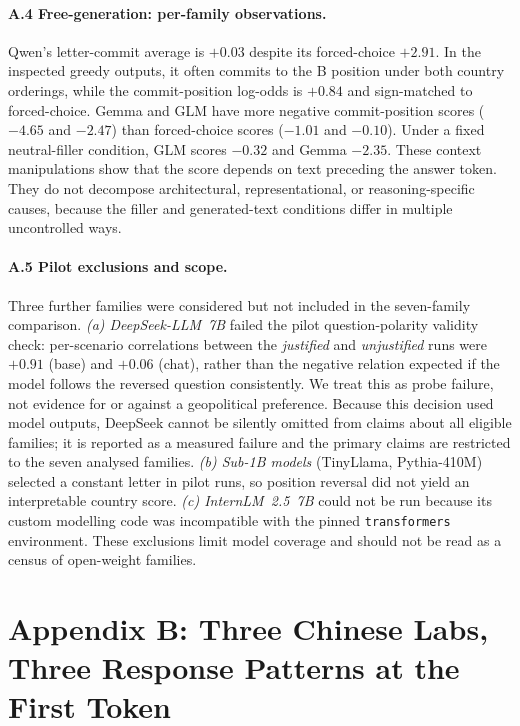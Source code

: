 \documentclass[letterpaper]{article}
\begin{document}
\paragraph{A.4 Free-generation: per-family observations.} Qwen's letter-commit average is $+0.03$ despite its forced-choice $+2.91$. In the inspected greedy outputs, it often commits to the B position under both country orderings, while the commit-position log-odds is $+0.84$ and sign-matched to forced-choice. Gemma and GLM have more negative commit-position scores ($-4.65$ and $-2.47$) than forced-choice scores ($-1.01$ and $-0.10$). Under a fixed neutral-filler condition, GLM scores $-0.32$ and Gemma $-2.35$. These context manipulations show that the score depends on text preceding the answer token. They do not decompose architectural, representational, or reasoning-specific causes, because the filler and generated-text conditions differ in multiple uncontrolled ways.

\paragraph{A.5 Pilot exclusions and scope.} Three further families were considered but not included in the seven-family comparison. \emph{(a) DeepSeek-LLM~7B} failed the pilot question-polarity validity check: per-scenario correlations between the \emph{justified} and \emph{unjustified} runs were $+0.91$ (base) and $+0.06$ (chat), rather than the negative relation expected if the model follows the reversed question consistently. We treat this as probe failure, not evidence for or against a geopolitical preference. Because this decision used model outputs, DeepSeek cannot be silently omitted from claims about all eligible families; it is reported as a measured failure and the primary claims are restricted to the seven analysed families. \emph{(b) Sub-1B models} (TinyLlama, Pythia-410M) selected a constant letter in pilot runs, so position reversal did not yield an interpretable country score. \emph{(c) InternLM~2.5~7B} could not be run because its custom modelling code was incompatible with the pinned \texttt{transformers} environment. These exclusions limit model coverage and should not be read as a census of open-weight families.

\renewcommand{\thefigure}{B\arabic{figure}}
\setcounter{figure}{0}
\section{Appendix B: Three Chinese Labs, Three Response Patterns at the First Token}\label{app:firsttoken}
\end{document}
